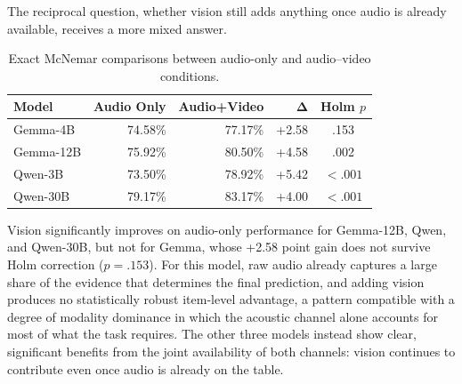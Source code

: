 The reciprocal question, whether vision still adds anything once audio is already available, receives a more mixed answer.
\begin{table}[h]
    \centering
    \small
    \begin{tabular}{lrrrc}
        \hline
        \textbf{Model} &
        \textbf{Audio Only} &
        \textbf{Audio+Video} &
        $\boldsymbol{\Delta}$ &
        \textbf{Holm $p$} \\
        \hline
        Gemma-4B     & 74.58\% & 77.17\% & +2.58 & .153 \\
        Gemma-12B & 75.92\% & 80.50\% & +4.58 & .002 \\
        Qwen-3B  & 73.50\% & 78.92\% & +5.42 & $<.001$ \\
        Qwen-30B & 79.17\% & 83.17\% & +4.00 & $<.001$ \\
        \hline
    \end{tabular}
    \caption{Exact McNemar comparisons between audio-only and audio--video conditions.}
    \label{tab:mcnemar_audio_video}
\end{table}
Vision significantly improves on audio-only performance for Gemma-12B, Qwen, and Qwen-30B, but not for Gemma, whose +2.58 point gain does not survive Holm correction ($p=.153$). For this model, raw audio already captures a large share of the evidence that determines the final prediction, and adding vision produces no statistically robust item-level advantage, a pattern compatible with a degree of modality dominance in which the acoustic channel alone accounts for most of what the task requires. The other three models instead show clear, significant benefits from the joint availability of both channels: vision continues to contribute even once audio is already on the table.
